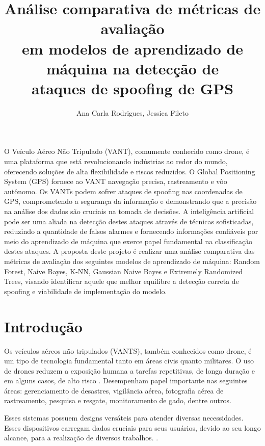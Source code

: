 \documentclass[12pt]{article}
\title{Análise comparativa de métricas de avaliação\\
em modelos de aprendizado de máquina na detecção de\\
ataques de spoofing de GPS
}
\author{Ana Carla Rodrigues\inst{1}, Jessica Fileto\inst{1}}
\begin{document}
\maketitle
     
\begin{resumo} 
O Veículo Aéreo Não Tripulado (VANT), comumente conhecido como drone, é uma
plataforma que está revolucionando indústrias ao redor do mundo, oferecendo 
soluções de alta flexibilidade e riscos reduzidos. O Global Positioning System 
(GPS) fornece ao VANT navegação precisa, rastreamento e vôo autônomo. Os VANTs 
podem sofrer ataques de spoofing nas coordenadas de GPS, comprometendo a 
segurança da informação e demonstrando que a precisão na análise dos dados são 
cruciais na tomada de decisões. A inteligência artificial pode ser uma aliada 
na detecção destes ataques através de técnicas sofisticadas, reduzindo a 
quantidade de falsos alarmes e fornecendo informações confiáveis por meio do 
aprendizado de máquina que exerce papel fundamental na classificação destes 
ataques. A proposta deste projeto é realizar uma análise comparativa das 
métricas de avaliação dos seguintes modelos de aprendizado de máquina: Random 
Forest, Naive Bayes, K-NN, Gaussian Naive Bayes e Extremely Randomized Trees, visando identificar 
aquele que melhor equilibre a detecção correta de spoofing e viabilidade de 
implementação do modelo.
\end{resumo}

\section{Introdução}

Os veículos aéreos não tripulados (VANTS), também conhecidos como drone,
é um tipo de tecnologia fundamental tanto em áreas civis quanto militares.
O uso de drones reduzem a exposição humana a tarefas repetitivas, de longa duração e em alguns casos, de alto risco \cite{dialogos}.
Desempenham papel importante nas seguintes áreas: gerenciamento de desastres, vigilância aérea, fotografia aérea de rastreamento, pesquisa e resgate,
monitoramento de gado, dentre outros. \cite{titounaLightweightSecurityTechnique2021} 

Esses sistemas possuem designs versáteis para atender diversas necessidades.
Esses dispositivos carregam dados cruciais para seus usuários, devido ao seu longo alcance,
para a realização de diversos trabalhos. \cite{khan}. 
\end{document}
